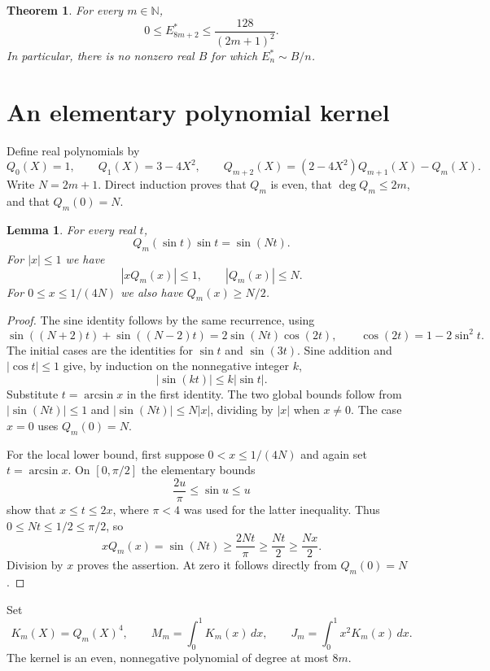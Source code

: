 \documentclass[11pt]{article}
\newtheorem{theorem}{Theorem}
\newtheorem{lemma}{Lemma}
\newcommand{\N}{\mathbb N}
\newcommand{\dd}{\,dx}
\begin{document}
\begin{theorem}\label{thm:main}
For every $m\in\N$,
\[
 0\le E_{8m+2}^*\le\frac{128}{(2m+1)^2}.
\]
In particular, there is no nonzero real $B$ for which $E_n^*\sim B/n$.
\end{theorem}

\section{An elementary polynomial kernel}
Define real polynomials by
\[
 Q_0(X)=1,\qquad Q_1(X)=3-4X^2,\qquad
 Q_{m+2}(X)=(2-4X^2)Q_{m+1}(X)-Q_m(X).
\]
Write $N=2m+1$. Direct induction proves that $Q_m$ is even, that
$\deg Q_m\le2m$, and that $Q_m(0)=N$.

\begin{lemma}\label{lem:q}
For every real $t$,
\[
 Q_m(\sin t)\sin t=\sin(Nt).
\]
For $|x|\le1$ we have
\[
 |xQ_m(x)|\le1,\qquad |Q_m(x)|\le N.
\]
For $0\le x\le1/(4N)$ we also have $Q_m(x)\ge N/2$.
\end{lemma}
\begin{proof}
The sine identity follows by the same recurrence, using
\[
 \sin((N+2)t)+\sin((N-2)t)
 =2\sin(Nt)\cos(2t),\qquad \cos(2t)=1-2\sin^2t.
\]
The initial cases are the identities for $\sin t$ and $\sin(3t)$.
Sine addition and $|\cos t|\le1$ give, by induction on the nonnegative integer $k$,
\[
 |\sin(kt)|\le k|\sin t|.
\]
Substitute $t=\arcsin x$ in the first identity. The two global bounds follow from $|\sin(Nt)|\le1$ and $|\sin(Nt)|\le N|x|$, dividing by $|x|$ when $x\ne0$. The case $x=0$ uses $Q_m(0)=N$.

For the local lower bound, first suppose $0<x\le1/(4N)$ and again set $t=\arcsin x$. On $[0,\pi/2]$ the elementary bounds
\[
 \frac{2u}{\pi}\le\sin u\le u
\]
show that $x\le t\le2x$, where $\pi<4$ was used for the latter inequality. Thus $0\le Nt\le1/2\le\pi/2$, so
\[
 xQ_m(x)=\sin(Nt)\ge\frac{2Nt}{\pi}
 \ge\frac{Nt}{2}\ge\frac{Nx}{2}.
\]
Division by $x$ proves the assertion. At zero it follows directly from $Q_m(0)=N$.
\end{proof}

Set
\[
 K_m(X)=Q_m(X)^4,\qquad
 M_m=\int_0^1K_m(x)\dd,\qquad
 J_m=\int_0^1x^2K_m(x)\dd.
\]
The kernel is an even, nonnegative polynomial of degree at most $8m$.
\end{document}
